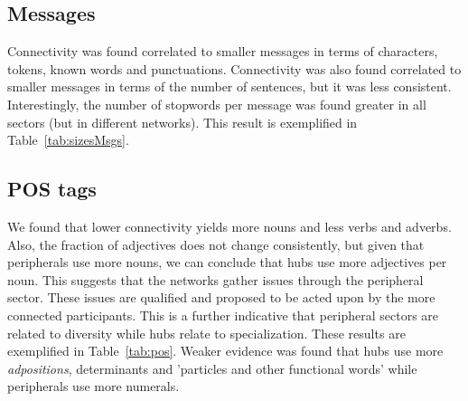 \subsection{Messages}\label{subsec:mm}
Connectivity was found correlated to smaller messages in terms of characters, tokens, known words and punctuations.
Connectivity was also found correlated to smaller messages in terms of the number of sentences, but
it was less consistent.
Interestingly, the number of stopwords per message was found greater in all sectors (but in different networks).
This result is exemplified in Table~\ref{tab:sizesMsgs}.

\FloatBarrier



\subsection{POS tags}\label{subsec:pos}
We found that lower connectivity yields more nouns and less verbs and adverbs.
Also, the fraction of adjectives does not change consistently,
but given that peripherals use more nouns,
we can conclude that hubs use more adjectives per noun.
This suggests that the networks gather issues
through the peripheral sector. 
These issues are qualified and proposed to be acted upon
by the more connected participants.
This is a further indicative that peripheral sectors
are related to diversity while hubs relate to specialization.
These results are exemplified in Table~\ref{tab:pos}.
Weaker evidence was found that hubs use more \emph{adpositions},
determinants and 'particles and other functional words' while
peripherals use more numerals.

\FloatBarrier


